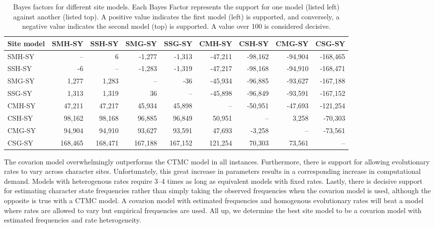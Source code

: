 \begin{table}

\caption{\label{tab:site-models}Bayes factors for different site models. Each Bayes Factor represents the support for one model (listed left) against another (listed top). A positive value indicates the first model (left) is supported, and conversely, a negative value indicates the second model (top) is supported. A value over 100 is considered decisive.}
\centering
\begin{tabular}[t]{lrrrrrrrr}
\toprule
Site model & SMH-SY & SSH-SY & SMG-SY & SSG-SY & CMH-SY & CSH-SY & CMG-SY & CSG-SY\\
\midrule
SMH-SY & -- & 6 & -1,277 & -1,313 & -47,211 & -98,162 & -94,904 & -168,465\\
SSH-SY & -6 & -- & -1,283 & -1,319 & -47,217 & -98,168 & -94,910 & -168,471\\
SMG-SY & 1,277 & 1,283 & -- & -36 & -45,934 & -96,885 & -93,627 & -167,188\\
SSG-SY & 1,313 & 1,319 & 36 & -- & -45,898 & -96,849 & -93,591 & -167,152\\
\addlinespace
CMH-SY & 47,211 & 47,217 & 45,934 & 45,898 & -- & -50,951 & -47,693 & -121,254\\
CSH-SY & 98,162 & 98,168 & 96,885 & 96,849 & 50,951 & -- & 3,258 & -70,303\\
CMG-SY & 94,904 & 94,910 & 93,627 & 93,591 & 47,693 & -3,258 & -- & -73,561\\
CSG-SY & 168,465 & 168,471 & 167,188 & 167,152 & 121,254 & 70,303 & 73,561 & --\\
\bottomrule
\end{tabular}
\end{table}

The covarion model overwhelmingly outperforms the CTMC model in all instances. Furthermore, there is support for allowing evolutionary rates to vary across character sites. Unfortunately, this great increase in parameters results in a corresponding increase in computational demand. Models with heterogenous rates require 3--4 times as long as equivalent models with fixed rates. Lastly, there is decisive support for estimating character state frequencies rather than simply taking the observed frequencies when the covarion model is used, although the opposite is true with a CTMC model. A covarion model with estimated frequencies and homogenous evolutionary rates will beat a model where rates are allowed to vary but empirical frequencies are used. All up, we determine the best site model to be a covarion model with estimated frequencies and rate heterogeneity.

